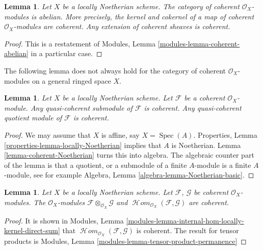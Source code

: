 \documentclass{stacks-project}
\theoremstyle{plain}
\newtheorem{lemma}[subsection]{Lemma}
\theoremstyle{definition}
\theoremstyle{remark}
\numberwithin{equation}{subsection}
\def\Spec{\mathop{\mathrm{Spec}}}
\def\SheafHom{\mathop{\mathcal{H}\!\mathit{om}}\nolimits}
\begin{document}
\begin{lemma}
\label{lemma-coherent-abelian-Noetherian}
Let $X$ be a locally Noetherian scheme.
The category of coherent $\mathcal{O}_X$-modules is abelian.
More precisely, the kernel and cokernel of a map of coherent
$\mathcal{O}_X$-modules are coherent. Any extension
of coherent sheaves is coherent.
\end{lemma}

\begin{proof}
This is a restatement of
Modules, Lemma \ref{modules-lemma-coherent-abelian}
in a particular case.
\end{proof}

\noindent
The following lemma does not always hold for the category of coherent
$\mathcal{O}_X$-modules on a general ringed space $X$.

\begin{lemma}
\label{lemma-coherent-Noetherian-quasi-coherent-sub-quotient}
Let $X$ be a locally Noetherian scheme.
Let $\mathcal{F}$ be a coherent $\mathcal{O}_X$-module.
Any quasi-coherent submodule of $\mathcal{F}$ is coherent.
Any quasi-coherent quotient module of $\mathcal{F}$ is coherent.
\end{lemma}

\begin{proof}
We may assume that $X$ is affine, say $X = \Spec(A)$.
Properties, Lemma \ref{properties-lemma-locally-Noetherian}
implies that $A$ is Noetherian. Lemma \ref{lemma-coherent-Noetherian}
turns this into algebra. The algebraic counter part of
the lemma is that a quotient, or a submodule of a finite $A$-module
is a finite $A$-module, see for example
Algebra, Lemma \ref{algebra-lemma-Noetherian-basic}.
\end{proof}

\begin{lemma}
\label{lemma-tensor-hom-coherent}
Let $X$ be a locally Noetherian scheme.
Let $\mathcal{F}$, $\mathcal{G}$ be coherent $\mathcal{O}_X$-modules.
The $\mathcal{O}_X$-modules $\mathcal{F} \otimes_{\mathcal{O}_X} \mathcal{G}$
and $\SheafHom_{\mathcal{O}_X}(\mathcal{F}, \mathcal{G})$ are
coherent.
\end{lemma}

\begin{proof}
It is shown in
Modules, Lemma \ref{modules-lemma-internal-hom-locally-kernel-direct-sum} that
$\SheafHom_{\mathcal{O}_X}(\mathcal{F}, \mathcal{G})$ is coherent.
The result for tensor products is
Modules, Lemma \ref{modules-lemma-tensor-product-permanence}
\end{proof}
\end{document}
